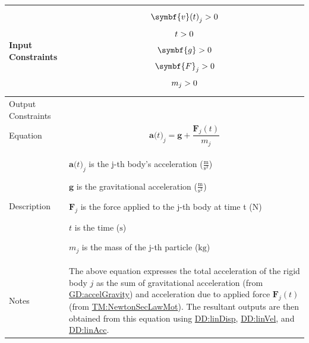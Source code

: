 \documentclass[12pt]{article}
\newcommand{\gt}{\ensuremath >}
\begin{document}
\begin{minipage}{\textwidth}
\begin{tabular}{>{\raggedright}p{}>{\raggedright\arraybackslash}p{}}
\\ \midrule
Input Constraints & \begin{displaymath}
                    {\symbf{v}\text{(}t\text{)}_{j}}\gt{}0
                    \end{displaymath}
                    \begin{displaymath}
                    t\gt{}0
                    \end{displaymath}
                    \begin{displaymath}
                    \symbf{g}\gt{}0
                    \end{displaymath}
                    \begin{displaymath}
                    {\symbf{F}_{j}}\gt{}0
                    \end{displaymath}
                    \begin{displaymath}
                    {m_{j}}\gt{}0
                    \end{displaymath}
\\ \midrule
Output Constraints & 
\\ \midrule
Equation & \begin{displaymath}
           {\symbf{a}\text{(}t\text{)}_{j}}=\symbf{g}+\frac{{\symbf{F}_{j}}\left(t\right)}{{m_{j}}}
           \end{displaymath}
\\ \midrule
Description & \begin{symbDescription}
              \item{${\symbf{a}\text{(}t\text{)}_{j}}$ is the j-th body's acceleration ($\frac{\text{m}}{\text{s}^{2}}$)}
              \item{$\symbf{g}$ is the gravitational acceleration ($\frac{\text{m}}{\text{s}^{2}}$)}
              \item{${\symbf{F}_{j}}$ is the force applied to the j-th body at time t (${\text{N}}$)}
              \item{$t$ is the time (${\text{s}}$)}
              \item{${m_{j}}$ is the mass of the j-th particle (${\text{kg}}$)}
              \end{symbDescription}
\\ \midrule
Notes & The above equation expresses the total acceleration of the rigid body $j$ as the sum of gravitational acceleration (from \hyperref[GD:accelGravity]{GD:accelGravity}) and acceleration due to applied force ${\symbf{F}_{j}}\left(t\right)$ (from \hyperref[TM:NewtonSecLawMot]{TM:NewtonSecLawMot}). The resultant outputs are then obtained from this equation using \hyperref[DD:linDisp]{DD:linDisp}, \hyperref[DD:linVel]{DD:linVel}, and \hyperref[DD:linAcc]{DD:linAcc}.
        

\end{tabular}
\end{minipage}
\end{document}
